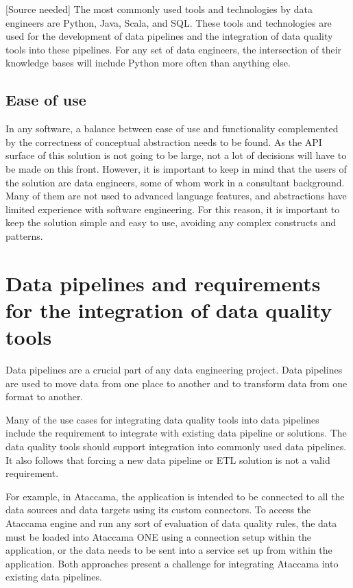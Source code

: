 [Source needed] The most commonly used tools and technologies by data engineers are Python, Java, Scala, and SQL. These tools and technologies are used for the development of data pipelines and the integration of data quality tools into these pipelines. For any set of data engineers, the intersection of their knowledge bases will include Python more often than anything else.

\subsection{Ease of use}

In any software, a balance between ease of use and functionality complemented by the correctness of conceptual abstraction needs to be found. As the API surface of this solution is not going to be large, not a lot of decisions will have to be made on this front. However, it is important to keep in mind that the users of the solution are data engineers, some of whom work in a consultant background. Many of them are not used to advanced language features, and abstractions have limited experience with software engineering. For this reason, it is important to keep the solution simple and easy to use, avoiding any complex constructs and patterns.

\section{Data pipelines and requirements for the integration of data quality tools}

Data pipelines are a crucial part of any data engineering project. Data pipelines are used to move data from one place to another and to transform data from one format to another. 

Many of the use cases for integrating data quality tools into data pipelines include the requirement to integrate with existing data pipeline or solutions. The data quality tools should support integration into commonly used data pipelines. It also follows that forcing a new data pipeline or ETL solution is not a valid requirement. 

For example, in Ataccama, the application is intended to be connected to all the data sources and data targets using its custom connectors. To access the Ataccama engine and run any sort of evaluation of data quality rules, the data must be loaded into Ataccama ONE using a connection setup within the application, or the data needs to be sent into a service set up from within the application. Both approaches present a challenge for integrating Ataccama into existing data pipelines.

